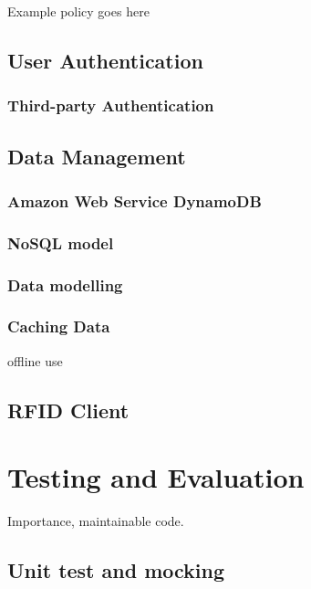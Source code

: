\documentclass[a4paper, 11pt]{article}
\begin{document}
Example policy goes here

\subsection{User Authentication}
\subsubsection{Third-party Authentication}



\subsection{Data Management}
\subsubsection{Amazon Web Service DynamoDB}

\subsubsection{NoSQL model}
\subsubsection{Data modelling} 
\subsubsection{Caching Data} offline use 

\subsection{RFID Client}%

\section{Testing and Evaluation}
Importance, maintainable code.
\subsection{Unit test and mocking}
\end{document}
